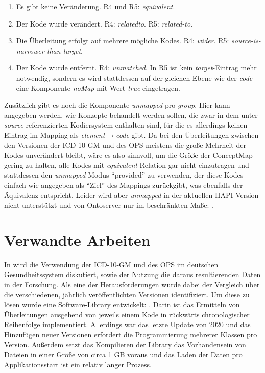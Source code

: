 \begin{enumerate}
\item Es gibt keine Veränderung. R4 und R5: \emph{equivalent}.
\item Der Kode wurde verändert. R4: \emph{relatedto}. R5: \emph{related-to}.
\item Die Überleitung erfolgt auf mehrere mögliche Kodes. R4: \emph{wider}. \newline R5: \emph{source-is-narrower-than-target}.
\item Der Kode wurde entfernt. R4: \emph{unmatched}. \newline In R5 ist kein \emph{target}-Eintrag mehr notwendig, sondern es wird stattdessen auf der gleichen Ebene wie der \emph{code} eine Komponente \emph{noMap} mit Wert \emph{true} eingetragen. 
\end{enumerate}

Zusätzlich gibt es noch die Komponente \emph{unmapped} pro \emph{group}. Hier kann angegeben werden, wie Konzepte behandelt werden sollen, die zwar in dem unter \emph{source} referenzierten Kodiersystem enthalten sind, für die es allerdings keinen Eintrag im Mapping als \emph{element$\rightarrow$code} gibt. Da bei den Überleitungen zwischen den Versionen der ICD-10-GM und des OPS meistens die große Mehrheit der Kodes unverändert bleibt, wäre es also sinnvoll, um die Größe der ConceptMap gering zu halten, alle Kodes mit \emph{equivalent}-Relation gar nicht einzutragen und stattdessen den \emph{unmapped}-Modus "`provided"' zu verwenden, der diese Kodes einfach wie angegeben als "`Ziel"' des Mappings zurückgibt, was ebenfalls der Äquivalenz entspricht. Leider wird aber \emph{unmapped} in der aktuellen HAPI-Version nicht unterstützt und von Ontoserver nur im beschränkten Maße: \cite{fhir-unmapped}.

\section{Verwandte Arbeiten}

In \cite{hund} wird die Verwendung der ICD-10-GM und des OPS im deutschen Gesundheitssystem diskutiert, sowie der Nutzung die daraus resultierenden Daten in der Forschung. Als eine der Herausforderungen wurde dabei der Vergleich über die verschiedenen, jährlich veröffentlichten Versionen identifiziert. Um diese zu lösen wurde eine Software-Library entwickelt: \cite{medicats}. Darin ist das Ermitteln von Überleitungen ausgehend von jeweils einem Kode in rückwärts chronologischer Reihenfolge implementiert. Allerdings war das letzte Update von 2020 und das Hinzufügen neuer Versionen erfordert die Programmierung mehrerer Klassen pro Version. Außerdem setzt das Kompilieren der Library das Vorhandensein von Dateien in einer Größe von circa 1 GB voraus und das Laden der Daten pro Applikationsstart ist ein relativ langer Prozess. 

